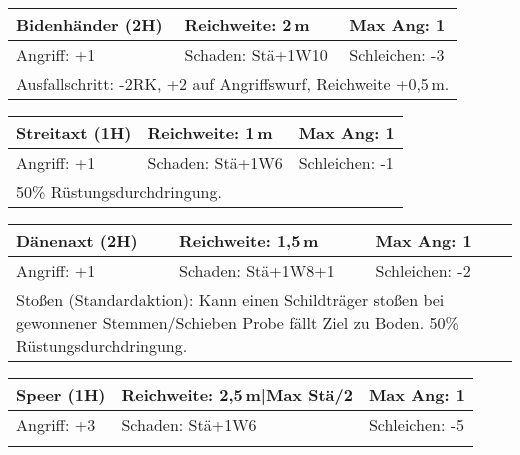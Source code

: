 \documentclass[../../Heldenanleitung2]{subfiles}
\begin{document}
\newline \newline\newline
\begin{tabular}{|p{}|p{}|p{}|}
\hline
\textbf{Bidenhänder (2H)} & Reichweite: 2\,m & Max Ang: 1\\
\hline
Angriff: +1 & Schaden: Stä+1W10 & Schleichen: -3\\
\hline
\multicolumn{3}{|p{0.99\textwidth}|}{Ausfallschritt: -2RK, +2 auf Angriffswurf, Reichweite +0,5\,m.} \\
\hline
\end{tabular}
\newline \newline\newline
\begin{tabular}{|p{}|p{}|p{}|}
\hline
\textbf{Streitaxt (1H)} & Reichweite: 1\,m & Max Ang: 1\\
\hline
Angriff: +1 & Schaden: Stä+1W6 & Schleichen: -1\\
\hline
\multicolumn{3}{|p{0.99\textwidth}|}{50\% Rüstungsdurchdringung.} \\
\hline
\end{tabular}
\newline \newline\newline
\begin{tabular}{|p{}|p{}|p{}|}
\hline
\textbf{Dänenaxt (2H)} & Reichweite: 1,5\,m & Max Ang: 1\\
\hline
Angriff: +1 & Schaden: Stä+1W8+1 & Schleichen: -2\\
\hline
\multicolumn{3}{|p{0.99\textwidth}|}{Stoßen (Standardaktion): Kann einen Schildträger stoßen bei gewonnener Stemmen/Schieben Probe fällt Ziel zu Boden. 50\% Rüstungsdurchdringung.} \\
\hline
\end{tabular}
\newline \newline\newline
\begin{tabular}{|p{}|p{}|p{}|}
\hline
\textbf{Speer (1H)} & Reichweite: 2,5\,m|Max Stä/2 & Max Ang: 1\\
\hline
Angriff: +3 & Schaden: Stä+1W6 & Schleichen: -5\\
\hline
\multicolumn{3}{|p{0.99\textwidth}|}{} \\
\hline
\end{tabular}
\end{document}
